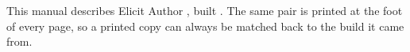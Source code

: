 \documentclass[11pt, a4paper]{article}
\begin{document}

\vspace{1em}

\begin{elicitnote}
This manual describes Elicit Author \textbf{\elicitVersion}, built \textbf{\elicitBuildDate}.
The same pair is printed at the foot of every page, so a printed copy can always be matched back
to the build it came from.
\end{elicitnote}
\end{document}
